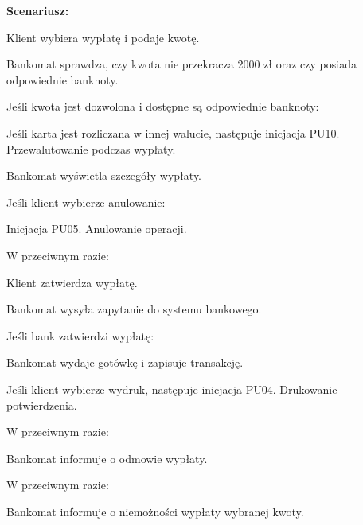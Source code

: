 \documentclass[10pt,a4paper]{article}
\begin{document}
\noindent\textbf{Scenariusz:}
\begin{scenariusz}
    \item Klient wybiera wypłatę i podaje kwotę.
    \item Bankomat sprawdza, czy kwota nie przekracza 2000 zł oraz czy posiada odpowiednie banknoty.
    \item Jeśli kwota jest dozwolona i dostępne są odpowiednie banknoty:
    \begin{scenariusz}
        \item Jeśli karta jest rozliczana w innej walucie, następuje inicjacja PU10. Przewalutowanie podczas wypłaty.
        \item Bankomat wyświetla szczegóły wypłaty.
        \item Jeśli klient wybierze anulowanie:
        \begin{scenariusz}
            \item Inicjacja PU05. Anulowanie operacji.
        \end{scenariusz}
        \item W przeciwnym razie:
        \begin{scenariusz}
            \item Klient zatwierdza wypłatę.
            \item Bankomat wysyła zapytanie do systemu bankowego.
            \item Jeśli bank zatwierdzi wypłatę:
            \begin{scenariusz}
                \item Bankomat wydaje gotówkę i zapisuje transakcję.
                \item Jeśli klient wybierze wydruk, następuje inicjacja PU04. Drukowanie potwierdzenia.
            \end{scenariusz}
            \item W przeciwnym razie:
            \begin{scenariusz}
                \item Bankomat informuje o odmowie wypłaty.
            \end{scenariusz}
        \end{scenariusz}
    \end{scenariusz}
    \item W przeciwnym razie:
    \begin{scenariusz}
        \item Bankomat informuje o niemożności wypłaty wybranej kwoty.
    \end{scenariusz}
\end{scenariusz}
\end{document}
